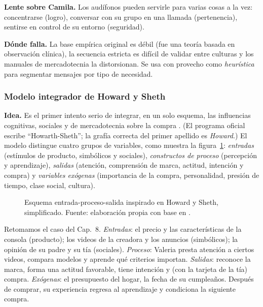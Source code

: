 \textbf{Lente sobre Camila.} Los audífonos pueden servirle para varias cosas
a la vez: concentrarse (logro), conversar con su grupo en una llamada
(pertenencia), sentirse en control de su entorno (seguridad).

\textbf{Dónde falla.} La base empírica original es débil (fue una teoría
basada en observación clínica), la secuencia estricta es difícil de validar
entre culturas y los manuales de mercadotecnia la distorsionan. Se usa con
provecho como \emph{heurística} para segmentar mensajes por tipo de necesidad.

\subsubsection{Modelo integrador de Howard y Sheth}
\label{sec:cap09-howard}

\textbf{Idea.} Es el primer intento serio de integrar, en un solo esquema,
las influencias cognitivas, sociales y de mercadotecnia sobre la compra
\parencite{howardsheth1969}. (El programa oficial escribe \enquote{Howarth-Sheth};
la grafía correcta del primer apellido es \emph{Howard}.) El modelo distingue
cuatro grupos de variables, como muestra la figura~\ref{fig:cap09-howard}:
\emph{entradas} (estímulos de producto, simbólicos y sociales), \emph{constructos
de proceso} (percepción y aprendizaje), \emph{salidas} (atención, comprensión de
marca, actitud, intención y compra) y \emph{variables exógenas} (importancia de la
compra, personalidad, presión de tiempo, clase social, cultura).

\begin{figure}[!htb]
  \centering
  \resizebox{0.95\textwidth}{!}{}
  \caption{Esquema entrada-proceso-salida inspirado en Howard y Sheth,
  simplificado. Fuente: elaboración propia con base en
  \textcite{howardsheth1969}.}
  \label{fig:cap09-howard}
\end{figure}

\begin{cajaEjemplo}[title={Ejemplo: la consola de Valeria, vista como sistema}]
Retomamos el caso del Cap.~8. \emph{Entradas}: el precio y las
características de la consola (producto); los videos de la creadora y los
anuncios (simbólicos); la opinión de su padre y su tía (sociales).
\emph{Proceso}: Valeria presta atención a ciertos videos, compara modelos y
aprende qué criterios importan. \emph{Salidas}: reconoce la marca, forma una
actitud favorable, tiene intención y (con la tarjeta de la tía) compra.
\emph{Exógenas}: el presupuesto del hogar, la fecha de su cumpleaños.
Después de comprar, su experiencia regresa al aprendizaje y condiciona la
siguiente compra.
\end{cajaEjemplo}


